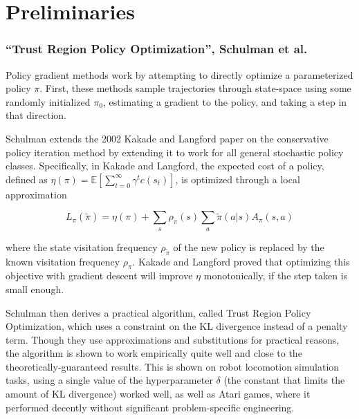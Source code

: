 \documentclass[12pt]{article}
\theoremstyle{plain}
\begin{document}
\part{Preliminaries}

\section{``Trust Region Policy Optimization'', Schulman et al.}

Policy gradient methods work by attempting to directly optimize a parameterized policy $\pi$.  First, these methods sample trajectories through state-space using some randomly initialized $\pi_0$, estimating a gradient to the policy, and taking a step in that direction.

Schulman extends the 2002 Kakade and Langford paper on the conservative policy iteration method by extending it to work for all general stochastic policy classes. Specifically, in Kakade and Langford, the expected cost of a policy, defined as $\eta(\pi) = \mathbb{E} [ \sum_{t=0}^\infty \gamma^t c(s_t)]$, is optimized through a local approximation

$$ L_\pi(\tilde{\pi}) = \eta(\pi) + \sum_s \rho_\pi (s) \sum_a \tilde{\pi} (a|s) A_\pi (s,a) $$

where the state visitation frequency $\rho_\tilde{\pi}$ of the new policy is replaced by the known visitation frequency $\rho_\pi$. Kakade and Langford proved that optimizing this objective with gradient descent will improve $\eta$ monotonically, if the step taken is small enough.


Schulman then derives a practical algorithm, called Trust Region Policy Optimization, which uses a constraint on the KL divergence instead of a penalty term. Though they use approximations and substitutions for practical reasons, the algorithm is shown to work empirically quite well and close to the theoretically-guaranteed results. This is shown on robot locomotion simulation tasks, using a single value of the hyperparameter $\delta$ (the constant that limits the amount of KL divergence) worked well, as well as Atari games, where it performed decently without significant problem-specific engineering.
\end{document}

